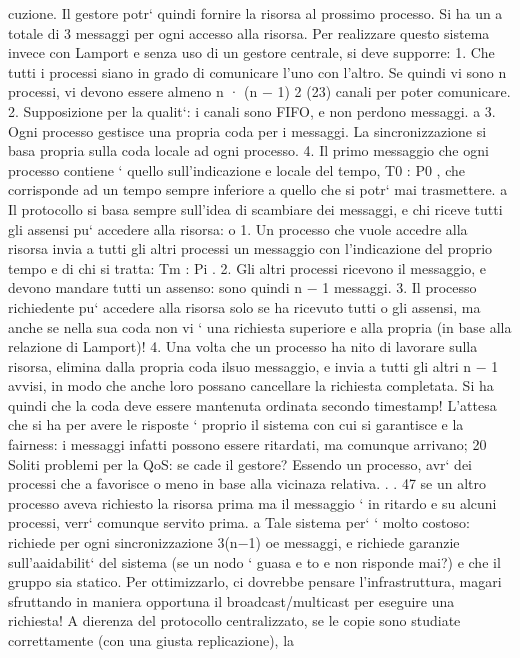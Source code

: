 \documentclass[a4paper,12pt]{article}
\begin{document}
cuzione. Il gestore potr` quindi fornire la risorsa al prossimo processo. Si ha un
a
totale di 3 messaggi per ogni accesso alla risorsa.
Per realizzare questo sistema invece con Lamport e senza uso di un gestore
centrale, si deve supporre:
1. Che tutti i processi siano in grado di comunicare l'uno con l'altro. Se
quindi vi sono n processi, vi devono essere almeno
n · (n $-$ 1)
2
(23)
canali per poter comunicare.
2. Supposizione per la qualit`: i canali sono FIFO, e non perdono messaggi.
a
3. Ogni processo gestisce una propria coda per i messaggi. La sincronizzazione si basa propria sulla coda locale ad ogni
processo.
4. Il primo messaggio che ogni processo contiene ` quello sull'indicazione
e
locale del tempo, T0 : P0 , che corrisponde ad un tempo sempre inferiore
a quello che si potr` mai trasmettere.
a
Il protocollo si basa sempre sull'idea di scambiare dei messaggi, e chi riceve tutti
gli assensi pu` accedere alla risorsa:
o
1. Un processo che vuole accedre alla risorsa invia a tutti gli altri processi un
messaggio con l'indicazione del proprio tempo e di chi si tratta: Tm : Pi .
2. Gli altri processi ricevono il messaggio, e devono mandare tutti un assenso:
sono quindi n $-$ 1 messaggi.
3. Il processo richiedente pu` accedere alla risorsa solo se ha ricevuto tutti
o
gli assensi, ma anche se nella sua coda non vi ` una richiesta superiore
e
alla propria (in base alla relazione di Lamport)!
4. Una volta che un processo ha nito di lavorare sulla risorsa, elimina dalla
propria coda ilsuo messaggio, e invia a tutti gli altri n $-$ 1 avvisi, in modo
che anche loro possano cancellare la richiesta completata.
Si ha quindi che la coda deve essere mantenuta ordinata secondo timestamp!
L'attesa che si ha per avere le risposte ` proprio il sistema con cui si garantisce
e
la fairness: i messaggi infatti possono essere ritardati, ma comunque arrivano;
20 Soliti problemi per la QoS: se cade il gestore? Essendo un processo, avr` dei processi che
a
favorisce o meno in base alla vicinaza relativa. . .
47
\newpage
se un altro processo aveva richiesto la risorsa prima ma il messaggio ` in ritardo
e
su alcuni processi, verr` comunque servito prima.
a
Tale sistema per` ` molto costoso: richiede per ogni sincronizzazione 3(n$-$1)
oe
messaggi, e richiede garanzie sull'aaidabilit` del sistema (se un nodo ` guasa
e
to e non risponde mai?) e che il gruppo sia statico. Per ottimizzarlo, ci
dovrebbe pensare l'infrastruttura, magari sfruttando in maniera opportuna il
broadcast/multicast per eseguire una richiesta!
A dierenza del protocollo centralizzato, se le copie sono studiate correttamente (con una giusta replicazione), la
\end{document}
